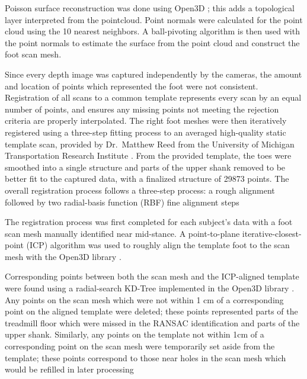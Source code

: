 \documentclass[defaultstyle,11pt]{thesis}
\begin{document}
Poisson surface reconstruction was done using Open3D \citep{Zhou2018}; this adds a topological layer interpreted from the pointcloud.
Point normals were calculated for the point cloud using the 10 nearest neighbors.
A ball-pivoting algorithm \citep{Bernardini1999} is then used with the point normals to estimate the surface from the point cloud and construct the foot scan mesh.

Since every depth image was captured independently by the cameras, the amount and location of points which represented the foot were not consistent.
Registration of all scans to a common template represents every scan by an equal number of points, and ensures any missing points not meeting the rejection criteria are properly interpolated.
The right foot meshes were then iteratively registered using a three-step fitting process to an averaged high-quality static template scan, provided by Dr.~Matthew Reed from the University of Michigan Transportation Research Institute \citep{Reed2013}.
From the provided template, the toes were smoothed into a single structure and parts of the upper shank removed to be better fit to the captured data, with a finalized structure of 29873 points.
The overall registration process follows a three-step process: a rough alignment followed by two radial-basis function (RBF) fine alignment steps

The registration process was first completed for each subject's data with a foot scan mesh manually identified near mid-stance.
A point-to-plane iterative-closest-point (ICP) algorithm \citep{Chen1992} was used to roughly align the template foot to the scan mesh with the Open3D library \citep{Zhou2018}.

Corresponding points between both the scan mesh and the ICP-aligned template were found using a radial-search KD-Tree implemented in the Open3D library \citep{Zhou2018}.
Any points on the scan mesh which were not within 1 cm of a corresponding point on the aligned template were deleted; these points represented parts of the treadmill floor which were missed in the RANSAC identification and parts of the upper shank.
Similarly, any points on the template not within 1cm of a corresponding point on the scan mesh were temporarily set aside from the template; these points correspond to those near holes in the scan mesh which would be refilled in later processing
\end{document}
